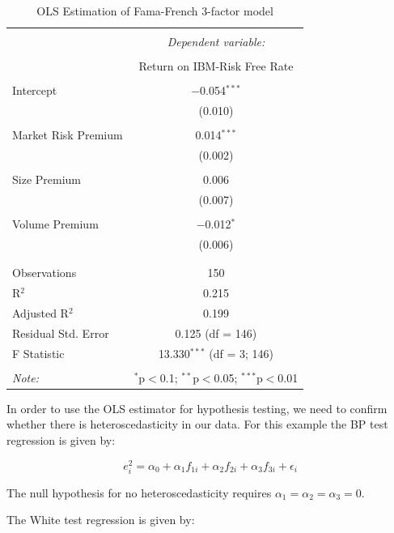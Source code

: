 \documentclass[
]{book}
\theoremstyle{definition}
\theoremstyle{definition}
\theoremstyle{definition}
\theoremstyle{definition}
\theoremstyle{remark}
\begin{document}
\begin{table}[!htbp] \centering 
  \caption{OLS Estimation of Fama-French 3-factor model} 
  \label{} 
\begin{tabular}{@{\extracolsep{5pt}}lc} 
\\[-1.8ex]\hline 
\hline \\[-1.8ex] 
 & \multicolumn{1}{c}{\textit{Dependent variable:}} \\ 
\cline{2-2} 
\\[-1.8ex] & Return on IBM-Risk Free Rate \\ 
\hline \\[-1.8ex] 
 Intercept & $-$0.054$^{***}$ \\ 
  & (0.010) \\ 
  & \\ 
 Market Risk Premium & 0.014$^{***}$ \\ 
  & (0.002) \\ 
  & \\ 
 Size Premium & 0.006 \\ 
  & (0.007) \\ 
  & \\ 
 Volume Premium & $-$0.012$^{*}$ \\ 
  & (0.006) \\ 
  & \\ 
\hline \\[-1.8ex] 
Observations & 150 \\ 
R$^{2}$ & 0.215 \\ 
Adjusted R$^{2}$ & 0.199 \\ 
Residual Std. Error & 0.125 (df = 146) \\ 
F Statistic & 13.330$^{***}$ (df = 3; 146) \\ 
\hline 
\hline \\[-1.8ex] 
\textit{Note:}  & \multicolumn{1}{r}{$^{*}$p$<$0.1; $^{**}$p$<$0.05; $^{***}$p$<$0.01} \\ 
\end{tabular} 
\end{table}

In order to use the OLS estimator for hypothesis testing, we need to confirm whether there is heteroscedasticity in our data. For this example the BP test regression is given by:

\[e^2_i=\alpha_0 + \alpha_1 f_{1i} + \alpha_2 f_{2i} +\alpha_3 f_{3i} + \epsilon_i\]

The null hypothesis for no heteroscedasticity requires \(\alpha_1=\alpha_2=\alpha_3=0\).

The White test regression is given by:
\end{document}
